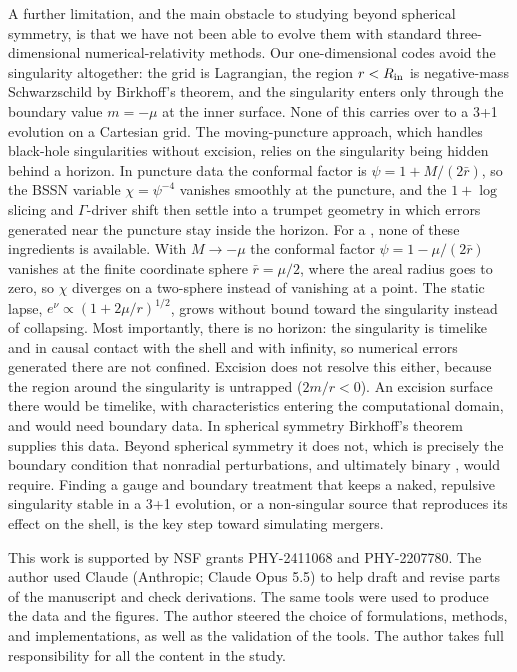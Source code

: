 \documentclass[%
 reprint,
 amsmath,amssymb,
 aps,prd,
 superscriptaddress,
]{revtex4-2}
\begin{document}
A further limitation, and the main obstacle to studying 
beyond spherical symmetry, is that we have not been able to evolve them with
standard three-dimensional numerical-relativity methods. Our one-dimensional
codes avoid the singularity altogether: the grid is Lagrangian, the region
$r<R_{\rm in}$ is negative-mass Schwarzschild by Birkhoff's theorem, and the
singularity enters only through the boundary value $m=-\mu$ at the inner
surface. None of this carries over to a 3+1 evolution on a Cartesian grid.
The moving-puncture approach, which handles black-hole singularities without
excision, relies on the singularity being hidden behind a horizon. In
puncture data the conformal factor is $\psi = 1 + M/(2\bar r)$, so the
BSSN variable $\chi=\psi^{-4}$ vanishes smoothly at the puncture, and the
$1+\log$ slicing and $\Gamma$-driver shift then settle into a trumpet
geometry in which errors generated near the puncture stay inside the
horizon. For a \singu{}, none of these ingredients is available.
With $M\to-\mu$ the conformal factor $\psi = 1-\mu/(2\bar r)$ vanishes at
the finite coordinate sphere $\bar r=\mu/2$, where the areal radius goes to
zero, so $\chi$ diverges on a two-sphere instead of vanishing at a point.
The static lapse, $e^{\nu}\propto(1+2\mu/r)^{1/2}$, grows without bound
toward the singularity instead of collapsing. Most importantly, there is no
horizon: the singularity is timelike and in causal contact with the shell
and with infinity, so numerical errors generated there are not confined.
Excision does not resolve this either, because the region around the
singularity is untrapped ($2m/r<0$). An excision surface there would be
timelike, with characteristics entering the computational domain, and would
need boundary data. In spherical symmetry Birkhoff's theorem supplies this
data. Beyond spherical symmetry it does not, which is precisely the boundary
condition that nonradial perturbations, and ultimately binary
, would require. Finding a gauge and boundary treatment
that keeps a naked, repulsive singularity stable in a 3+1 evolution, or a
non-singular source that reproduces its effect on the shell, is the key
step toward simulating \singu{} mergers.

\begin{acknowledgments}
This work is supported by NSF grants PHY-2411068 and PHY-2207780. The author used Claude (Anthropic; Claude Opus 5.5) to help draft and revise parts of the manuscript and check derivations. The same tools were used to produce the data and the figures. The author steered the choice of formulations, methods, and implementations, as well as the validation of the tools. The author takes full responsibility for all the content in the study. 
\end{acknowledgments}
\end{document}
